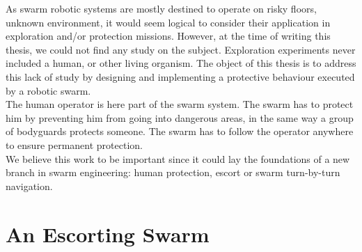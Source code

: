 \documentclass[oneside, a4paper, 12pt]{memoir}
\begin{document}

	
		
		
	
	As swarm robotic systems are mostly destined to operate on risky floors, unknown environment, it would seem logical to consider their application in exploration and/or protection missions. However, at the time of writing this thesis, we could not find any study on the subject. Exploration experiments never included a human, or other living organism. The object of this thesis is to address this lack of study by designing and implementing a protective behaviour executed by a robotic swarm.\\
	The human operator is here part of the swarm system. The swarm has to protect him by preventing him from going into dangerous areas, in the same way a group of bodyguards protects someone. The swarm has to follow the operator anywhere to ensure permanent protection.\\
	We believe this work to be important since it could lay the foundations of a new branch in swarm engineering: human protection, escort or swarm turn-by-turn navigation.

\chapter{An Escorting Swarm}
\label{chap:escorting_swarm}

\end{document}
